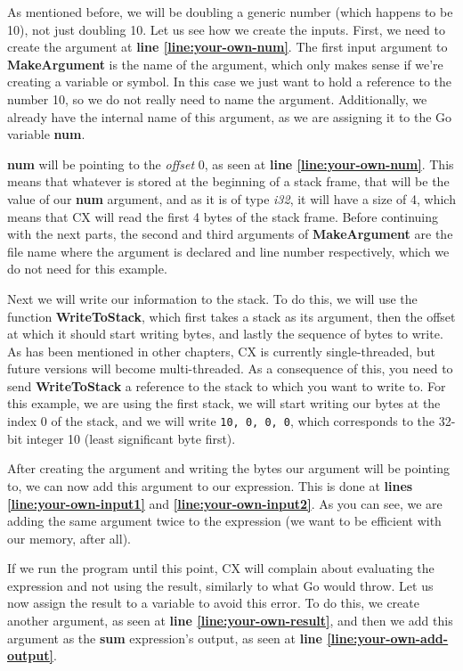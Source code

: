 \documentclass[11pt,fleqn,openany]{book} %
\begin{document}
As mentioned before, we will be doubling a generic number (which happens to be 10), not just doubling 10. Let us see how we create the inputs. First, we need to create the argument at \textbf{line \ref{line:your-own-num}}. The first input argument to \textbf{MakeArgument} is the name of the argument, which only makes sense if we're creating a variable or symbol. In this case we just want to hold a reference to the number 10, so we do not really need to name the argument. Additionally, we already have the internal name of this argument, as we are assigning it to the Go variable \textbf{num}.

\textbf{num} will be pointing to the \emph{offset} 0, as seen at \textbf{line \ref{line:your-own-num}}. This means that whatever is stored at the beginning of a stack frame, that will be the value of our \textbf{num} argument, and as it is of type \emph{i32}, it will have a size of 4, which means that CX will read the first 4 bytes of the stack frame. Before continuing with the next parts, the second and third arguments of \textbf{MakeArgument} are the file name where the argument is declared and line number respectively, which we do not need for this example.

Next we will write our information to the stack. To do this, we will use the function \textbf{WriteToStack}, which first takes a stack as its argument, then the offset at which it should start writing bytes, and lastly the sequence of bytes to write. As has been mentioned in other chapters, CX is currently single-threaded, but future versions will become multi-threaded. As a consequence of this, you need to send \textbf{WriteToStack} a reference to the stack to which you want to write to. For this example, we are using the first stack, we will start writing our bytes at the index 0 of the stack, and we will write \lstinline{10, 0, 0, 0}, which corresponds to the 32-bit integer 10 (least significant byte first).

After creating the argument and writing the bytes our argument will be pointing to, we can now add this argument to our expression. This is done at \textbf{lines \ref{line:your-own-input1}} and \textbf{\ref{line:your-own-input2}}. As you can see, we are adding the same argument twice to the expression (we want to be efficient with our memory, after all).

If we run the program until this point, CX will complain about evaluating the expression and not using the result, similarly to what Go would throw. Let us now assign the result to a variable to avoid this error. To do this, we create another argument, as seen at \textbf{line \ref{line:your-own-result}}, and then we add this argument as the \textbf{sum} expression's output, as seen at \textbf{line \ref{line:your-own-add-output}}.
\end{document}
